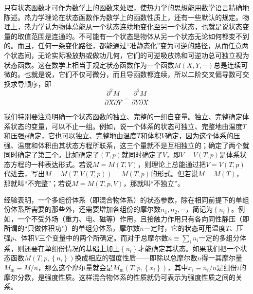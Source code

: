\documentclass[main.tex]{subfiles}
\begin{document}
只有状态函数才可作为数学上的函数来处理，使热力学的思想能用数学语言精确地陈述。热力学理论在状态函数作为数学上的函数性质上，还有一些默认的规定。物理上，热力学认为物体总能从一个状态连续地变化至另一个状态，也就是说状态变量的取值范围是连通的。不可能有一个状态是物体从另一个状态无论如何都变不到的。而且，任何一条变化路径，都能通过“准静态化”变为可逆的路径，从而任意两个状态间，无论实际吸放热或做功几何，它们的可逆吸放热和可逆功总可独立视为状态函数。这在数学上相当于规定状态函数作为一个函数$M\left(X,Y,\cdots\right)$总是连续可微的。也就是说，它们不仅可微分，而且导函数都连续，所以二阶交叉偏导数可交换求导顺序，即
\[\frac{\partial^2 M}{\partial X\partial Y}=\frac{\partial ^2 M}{\partial Y\partial X}\]

我们特别要注意明确一个状态函数的独立、完整的一组自变量。独立、完整确定体系状态的变量，可以不止一组。例如，说一个体系的状态可独立、完整地由温度$T$和压强$p$确定，它也可以独立、完整地由温度$T$和体积$V$确定，因为这个体系的压强、温度和体积由其状态方程所联系，这三个量就不是互相独立的；确定了两个就同时确定了第三个。比如确定了$\left(T,p\right)$就同时确定了$V$，即$V=V\left(T,p\right)$是体系状态方程的一种表达形式。若说$M=M\left(T,V\right)$，则理论上总能通过把$V=V\left(T,p\right)$代进去，写出$M=M\left(T,V\left(T,p\right)\right)=M\left(T,p\right)$的形式。但若说$M=M\left(T\right)$，那就叫“不完整”；若说$M=M\left(T,p,V\right)$，那就叫“不独立”。

经验表明，一个多组份体系（即混合物体系）的状态参数，除在相同前提下的单组份体系所需要的那些外，还需要增加各组份的摩尔数$n_1,n_2,\cdots$，简记为$\left\{n_i\right\}$。例如，一个不受外场（重力、电、磁等）作用，且接触力作用只有各向同性静压（即所谓的“只做体积功”）的单组分体系，摩尔数$n$一定时，它的状态可用温度$T$、压强$p$、体积$V$三个变量中的两个所确定。而对于总摩尔数$n\equiv\sum_in_i$一定的多组分体系，则还要在单组份情况的基础上加上$\left\{n_i\right\}$才能确定其状态。如果我们把一个状态函数$M\left(T,p,\left\{n_i\right\}\right)$换成相应的强度性质——即除以总摩尔数$n$得一其摩尔量$M_\text{m}\equiv M/n$，那么这个摩尔量就会是$M_\text{m}\left(T,p,\left\{x_i\right\}\right)$，其中$x_i\equiv n_i/n$是组份$i$的摩尔分数，是强度性质。这样混合物体系的性质就仍可表示为强度性质之间的关系。
\end{document}
